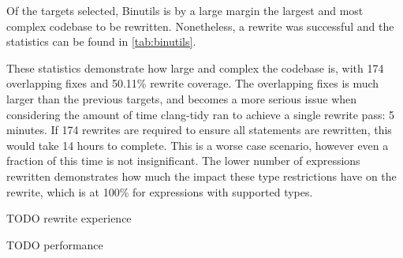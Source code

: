 Of the targets selected, Binutils is by a large margin the largest and most complex codebase to be rewritten. Nonetheless, a rewrite was successful and the statistics can be found in \ref{tab:binutils}.

These statistics demonstrate how large and complex the codebase is, with 174 overlapping fixes and 50.11\% rewrite coverage. The overlapping fixes is much larger than the previous targets, and becomes a more serious issue when considering the amount of time clang-tidy ran to achieve a single rewrite pass: 5 minutes. If 174 rewrites are required to ensure all statements are rewritten, this would take 14 hours to complete. This is a worse case scenario, however even a fraction of this time is not insignificant. The lower number of expressions rewritten demonstrates how much the impact these type restrictions have on the rewrite, which is at 100\% for expressions with supported types.

TODO rewrite experience

TODO performance

